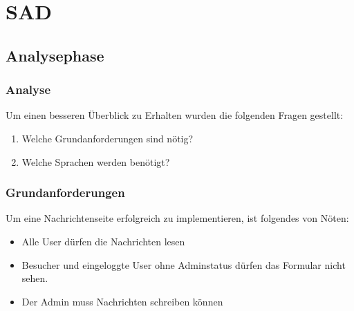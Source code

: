 \section{SAD}
\subsection{Analysephase}
\begin{frame} %
  \frametitle{Analyse} %

  Um einen besseren Überblick zu Erhalten wurden die folgenden Fragen gestellt:
  \begin{enumerate}
   \item Welche Grundanforderungen sind nötig?
   \item Welche Sprachen werden benötigt?
  \end{enumerate}

\end{frame}

\begin{frame} %
  \frametitle{Grundanforderungen} %

   Um eine Nachrichtenseite erfolgreich zu implementieren, ist folgendes von Nöten:
   \begin{itemize}
   	\item Alle User dürfen die Nachrichten lesen
    \item Besucher und eingeloggte User ohne Adminstatus dürfen das Formular nicht sehen.
    \item Der Admin muss Nachrichten schreiben können
   \end{itemize}

\end{frame}

